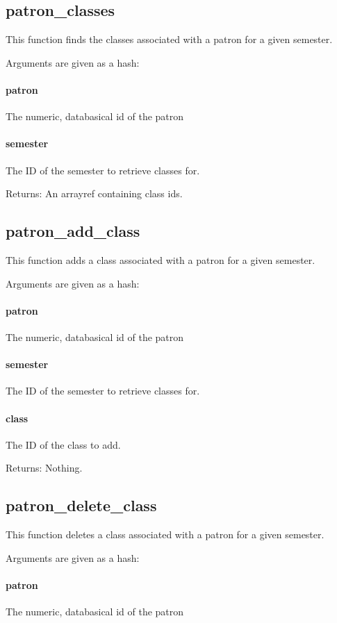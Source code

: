 \documentclass[12pt,titlepage]{article}
\begin{document}
\subsection{patron\_classes}
This function finds the classes associated with a patron for a given semester.

Arguments are given as a hash:
\paragraph{patron}
The numeric, databasical id of the patron 

\paragraph{semester}
The ID of the semester to retrieve classes for. 

Returns: An arrayref containing class ids.

\subsection{patron\_add\_class}
This function adds a class associated with a patron for a given semester.

Arguments are given as a hash:
\paragraph{patron}
The numeric, databasical id of the patron 

\paragraph{semester}
The ID of the semester to retrieve classes for. 

\paragraph{class}
The ID of the class to add. 

Returns: Nothing.

\subsection{patron\_delete\_class}
This function deletes a class associated with a patron for a given semester.

Arguments are given as a hash:
\paragraph{patron}
The numeric, databasical id of the patron 
\end{document}
